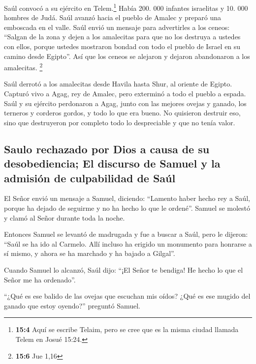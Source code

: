  Saúl convocó a su ejército en Telem.\footnote{\textbf{15:4}
  Aquí se escribe Telaim, pero se cree que es la misma ciudad llamada
  Telem en Josué 15:24.} Había 200. 000 infantes israelitas y 10. 000
hombres de Judá.  Saúl avanzó hacia el pueblo de Amalec y
preparó una emboscada en el valle.  Saúl envió un mensaje
para advertirles a los ceneos: ``Salgan de la zona y dejen a los
amalecitas para que no los destruya a ustedes con ellos, porque ustedes
mostraron bondad con todo el pueblo de Israel en su camino desde
Egipto''. Así que los ceneos se alejaron y dejaron abandonaron a los
amalecitas. \footnote{\textbf{15:6} Jue 1,16}

 Saúl derrotó a los amalecitas desde Havila hasta Shur, al
oriente de Egipto.  Capturó vivo a Agag, rey de Amalec,
pero exterminó a todo el pueblo a espada.  Saúl y su
ejército perdonaron a Agag, junto con las mejores ovejas y ganado, los
terneros y corderos gordos, y todo lo que era bueno. No quisieron
destruir eso, sino que destruyeron por completo todo lo despreciable y
que no tenía valor.

\hypertarget{saulo-rechazado-por-dios-a-causa-de-su-desobediencia-el-discurso-de-samuel-y-la-admisiuxf3n-de-culpabilidad-de-sauxfal}{%
\subsection{Saulo rechazado por Dios a causa de su desobediencia; El
discurso de Samuel y la admisión de culpabilidad de
Saúl}\label{saulo-rechazado-por-dios-a-causa-de-su-desobediencia-el-discurso-de-samuel-y-la-admisiuxf3n-de-culpabilidad-de-sauxfal}}

 El Señor envió un mensaje a Samuel, diciendo:
 ``Lamento haber hecho rey a Saúl, porque ha dejado de
seguirme y no ha hecho lo que le ordené''. Samuel se molestó y clamó al
Señor durante toda la noche.

 Entonces Samuel se levantó de madrugada y fue a buscar a
Saúl, pero le dijeron: ``Saúl se ha ido al Carmelo. Allí incluso ha
erigido un monumento para honrarse a sí mismo, y ahora se ha marchado y
ha bajado a Gilgal''.

 Cuando Samuel lo alcanzó, Saúl dijo: ``¡El Señor te
bendiga! He hecho lo que el Señor me ha ordenado''.

 ``¿Qué es ese balido de las ovejas que escuchan mis
oídos? ¿Qué es ese mugido del ganado que estoy oyendo?'' preguntó
Samuel.

